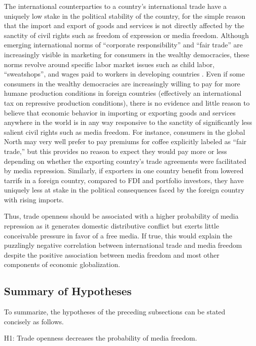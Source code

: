 \documentclass[12pt,a4paper]{article}\usepackage[]{graphicx}\usepackage[]{color}
\begin{document}
The international counterparties to a country's international trade have a uniquely low stake in the political stability of the country, for the simple reason that the import and export of goods and services is not directly affected by the sanctity of civil rights such as freedom of expression or media freedom. Although emerging international norms of “corporate responsibility” and “fair trade” are increasingly visible in marketing for consumers in the wealthy democracies, these norms revolve around specific labor market issues such as child labor, ``sweatshops'', and wages paid to workers in developing countries \parencite{Moore:2004gy}. Even if some consumers in the wealthy democracies are increasingly willing to pay for more humane production conditions in foreign countries (effectively an international tax on repressive production conditions), there is no evidence and little reason to believe that economic behavior in importing or exporting goods and services anywhere in the world is in any way responsive to the sanctity of significantly less salient civil rights such as media freedom. For instance, consumers in the global North may very well prefer to pay premiums for coffee explicitly labeled as “fair trade,” but this provides no reason to expect they would pay more or less depending on whether the exporting country's trade agreements were facilitated by media repression. Similarly, if exporters in one country benefit from lowered tarrifs in a foreign country, compared to FDI and portfolio investors, they have uniquely less at stake in the political consequences faced by the foreign country with rising imports.

Thus, trade openness should be associated with a higher probability of media repression as it generates domestic distributive conflict but exerts little conceivable pressure in favor of a free media. If true, this would explain the puzzlingly negative correlation between international trade and media freedom despite the positive association between media freedom and most other components of economic globalization.

\subsection{Summary of Hypotheses}

To summarize, the hypotheses of the preceding subsections can be stated concisely as follows.

H1: Trade openness decreases the probability of media freedom.
\end{document}
